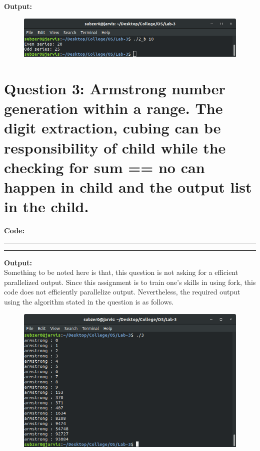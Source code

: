 \documentclass{article}
\begin{document}
\bigskip
\noindent
\textbf{\LARGE Output:}

\begin{figure}[ht]
    \includegraphics[width=\textwidth]{output/2_b.png}
\end{figure}
\bigskip
\bigskip
\bigskip

\section*{Question 3: Armstrong number generation within a range. The digit extraction, cubing can be responsibility of child while the checking for sum == no can happen in child and the output list in the child.}

\bigskip

\textbf{\LARGE Code:}
\smallskip
\par\noindent\rule{\textwidth}{0.4pt}

\par\noindent\rule{\textwidth}{0.4pt}

\bigskip
\noindent
\textbf{\LARGE Output:}
\bigskip \\Something to be noted here is that, this question is not asking for a 
efficient parallelized output. Since this assignment is to train one's 
skills in using fork, this code does not efficiently parallelize output.
Nevertheless, the required output using the algorithm stated in the question
is as follows.\\
\begin{figure}[ht]
    \includegraphics[width=\textwidth]{output/3.png}
\end{figure}
\end{document}
